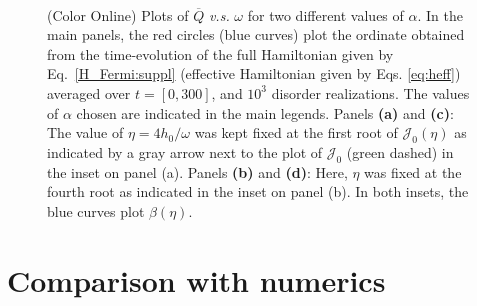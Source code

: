 \documentclass[aps,prl, notitlepage]{revtex4-1}
\begin{document}
 \begin{figure}[!t]
 \ 
 \caption{(Color Online) Plots of $\overline{Q} $ \textit{v.s.} $\omega$ for two different values of $\alpha$. In the main panels, the red circles  (blue curves) plot the ordinate obtained from the time-evolution of the full Hamiltonian given by Eq.~\ref{H_Fermi:suppl} (effective Hamiltonian given by Eqs. \ref{eq:heff}) averaged over $t=\left[0,300\right]$, and $10^3$ disorder realizations. The values of $\alpha$ chosen are indicated in the main legends. Panels {\bf (a)} and {\bf (c)}: The value of $\eta=4h_0/\omega$ was kept fixed at the first root of $\mathcal{J}_0(\eta)$ as indicated by a gray arrow next to the plot of $\mathcal{J}_0$ (green dashed) in the inset on panel (a). Panels {\bf (b)} and {\bf (d)}: Here, $\eta$ was fixed at the fourth root as indicated in the inset on panel (b). In both insets, the blue curves  plot $\beta(\eta)$.}
 \label{fig:multw:qcomp}
 \end{figure}
 
\section{\sc Comparison with numerics}
\end{document}
